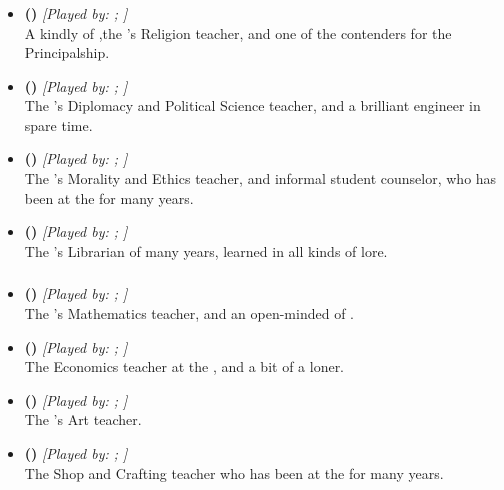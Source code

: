 \documentclass[blue]{GL2020}
\begin{document}
\subsubsection*{\pTech{}}
\begin{itemize}
	\item \textbf{\cBeetle{\full} (\cBeetle{\MYCharpronouns})} \textit{[Played by: \cBeetle{\MYplayer}; \cBeetle{\MYPlaypronouns}]}\\ A kindly \cBeetle{\cleric} of \cTechGod{},the \pSc{}'s Religion teacher, and one of the contenders for the Principalship.
	
	\item \textbf{\cChupInventor{\full} (\cChupInventor{\MYCharpronouns})} \textit{[Played by: \cChupInventor{\MYplayer}; \cChupInventor{\MYPlaypronouns}]}\\ The \pSc{}'s Diplomacy and Political Science teacher, and a brilliant engineer in \cChupInventor{\their} spare time.
	
	\item \textbf{\cEthics{\full} (\cEthics{\MYCharpronouns})} \textit{[Played by: \cEthics{\MYplayer}; \cEthics{\MYPlaypronouns}]}\\ The \pSc{}'s Morality and Ethics teacher, and informal student counselor, who has been at the \pSc{} for many years.
	
	\item \textbf{\cLibrarian{\full} (\cLibrarian{\MYCharpronouns})} \textit{[Played by: \cLibrarian{\MYplayer}; \cLibrarian{\MYPlaypronouns}]}\\ The \pSc{}'s Librarian of many years, learned in all kinds of lore.
\end{itemize}

\subsubsection*{\pShip{}}
\begin{itemize}
	\item \textbf{\cFlowPriest{\full} (\cFlowPriest{\MYCharpronouns})} \textit{[Played by: \cFlowPriest{\MYplayer}; \cFlowPriest{\MYPlaypronouns}]}\\ The \pSc{}'s Mathematics teacher, and an open-minded \cFlowPriest{\cleric} of \cFlow{}.
	
	\item \textbf{\cChupSecond{\full} (\cChupSecond{\MYCharpronouns})} \textit{[Played by: \cChupSecond{\MYplayer}; \cChupSecond{\MYPlaypronouns}]}\\ The Economics teacher at the \pSc{}, and a bit of a loner.
	
	\item \textbf{\cChupAvenger{\full} (\cChupAvenger{\MYCharpronouns})} \textit{[Played by: \cChupAvenger{\MYplayer}; \cChupAvenger{\MYPlaypronouns}]}\\ The \pSc{}'s Art teacher.
			
	\item \textbf{\cPirate{\full} (\cPirate{\MYCharpronouns})} \textit{[Played by: \cPirate{\MYplayer}; \cPirate{\MYPlaypronouns}]}\\ The Shop and Crafting teacher who has been at the \pSc{} for many years.
\end{itemize}
\end{document}
